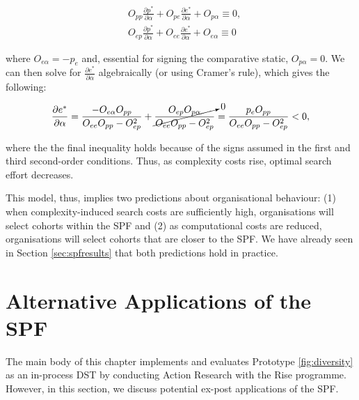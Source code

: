 \begin{align}
& O_{pp}\frac{\partial p^*}{\partial \alpha} + O_{pe}\frac{\partial e^*}{\partial \alpha} + O_{p\alpha} \equiv 0, \nonumber \\
& O_{ep}\frac{\partial p^*}{\partial \alpha} + O_{ee}\frac{\partial e^*}{\partial \alpha} + O_{e\alpha} \equiv 0  \nonumber
\end{align}

\noindent where $O_{e\alpha} = -p_e$ and, essential for signing the comparative static, $O_{p\alpha} = 0$. We can then solve for $\frac{\partial e^*}{\partial \alpha}$ algebraically (or using Cramer's rule), which gives the following:

\begin{equation}
\frac{\partial e^*}{\partial \alpha} = \frac{-O_{e\alpha}O_{pp}}{O_{ee}O_{pp} - O_{ep}^2} + \cancelto{0}{\frac{O_{ep}O_{p\alpha}}{O_{ee}O_{pp} - O_{ep}^2}} = \frac{p_eO_{pp}}{O_{ee}O_{pp} - O_{ep}^2} < 0, \label{eq:comp_stat}
\end{equation}

\noindent where the the final inequality holds because of the signs assumed in the first and third second-order conditions. Thus, as complexity costs rise, optimal search effort decreases.

This model, thus, implies two predictions about organisational behaviour: (1) when complexity-induced search costs are sufficiently high, organisations will select cohorts within the SPF and (2) as computational costs are reduced, organisations will select cohorts that are closer to the SPF. We have already seen in Section \ref{sec:spfresults} that both predictions hold in practice.

\section{Alternative Applications of the SPF}\label{sec:spfapplications}
The main body of this chapter implements and evaluates Prototype \ref{fig:diversity} as an in-process DST by conducting Action Research with the Rise programme. However, in this section, we discuss potential ex-post applications of the SPF.

